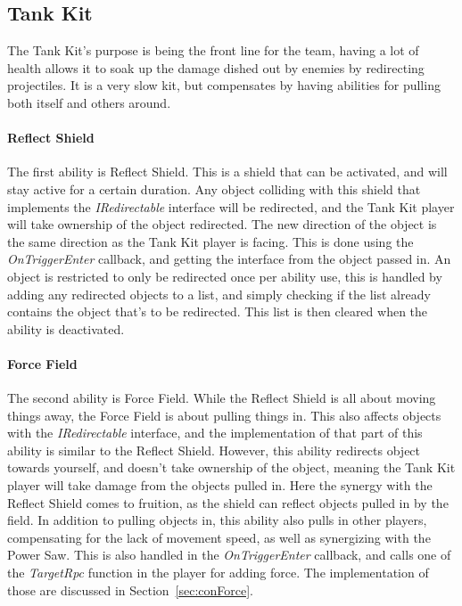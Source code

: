 \subsection{Tank Kit}
The Tank Kit's purpose is being the front line for the team, having a lot of health allows it to soak up the damage dished out by enemies by redirecting projectiles. It is a very slow kit, but compensates by having abilities for pulling both itself and others around.

\paragraph{Reflect Shield}
The first ability is Reflect Shield. This is a shield that can be activated, and will stay active for a certain duration. Any object colliding with this shield that implements the \emph{IRedirectable} interface will be redirected, and the Tank Kit player will take ownership of the object redirected. The new direction of the object is the same direction as the Tank Kit player is facing. This is done using the \emph{OnTriggerEnter} callback, and getting the interface from the object passed in. An object is restricted to only be redirected once per ability use, this is handled by adding any redirected objects to a list, and simply checking if the list already contains the object that's to be redirected. This list is then cleared when the ability is deactivated.

\paragraph{Force Field}
The second ability is Force Field. While the Reflect Shield is all about moving things away, the Force Field is about pulling things in. This also affects objects with the \emph{IRedirectable} interface, and the implementation of that part of this ability is similar to the Reflect Shield. However, this ability redirects object towards yourself, and doesn't take ownership of the object, meaning the Tank Kit player will take damage from the objects pulled in. Here the synergy with the Reflect Shield comes to fruition, as the shield can reflect objects pulled in by the field. In addition to pulling objects in, this ability also pulls in other players, compensating for the lack of movement speed, as well as synergizing with the Power Saw. This is also handled in the \emph{OnTriggerEnter} callback, and calls one of the \emph{TargetRpc} function in the player for adding force. The implementation of those are discussed in Section~\ref{sec:conForce}.

